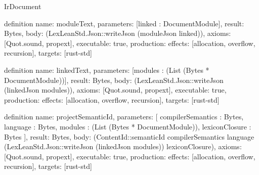 \begin{lexlean}{IrDocument}
\begin{semanticmodule}
definition{
  name: moduleText,
  parameters: [linked : DocumentModule],
  result: Bytes,
  body: (LexLeanStd.Json::writeJson (moduleJson linked)),
  axioms: [Quot.sound, propext],
  executable: true,
  production: {effects: [allocation, overflow, recursion], targets: [rust-std]}
}

definition{
  name: linkedText,
  parameters: [modules : (List (Bytes * DocumentModule))],
  result: Bytes,
  body: (LexLeanStd.Json::writeJson (linkedJson modules)),
  axioms: [Quot.sound, propext],
  executable: true,
  production: {effects: [allocation, overflow, recursion], targets: [rust-std]}
}

definition{
  name: projectSemanticId,
  parameters: [
    compilerSemantics : Bytes,
    language : Bytes,
    modules : (List (Bytes * DocumentModule)),
    lexiconClosure : Bytes
  ],
  result: Bytes,
  body: (ContentId::semanticId compilerSemantics language (LexLeanStd.Json::writeJson (linkedJson modules)) lexiconClosure),
  axioms: [Quot.sound, propext],
  executable: true,
  production: {effects: [allocation, overflow, recursion], targets: [rust-std]}
}
\end{semanticmodule}
\end{lexlean}
